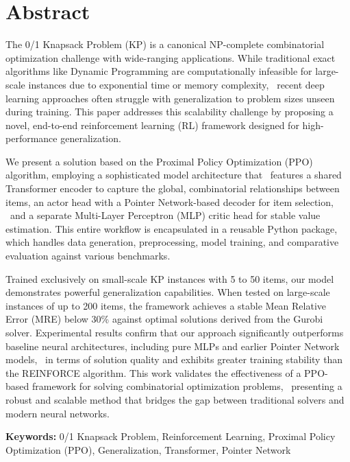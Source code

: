 
\chapter*{Abstract}

The 0/1 Knapsack Problem (KP) is a canonical NP-complete combinatorial optimization challenge with wide-ranging applications.
While traditional exact algorithms like Dynamic Programming are computationally infeasible for large-scale instances due to exponential time or memory complexity, \
 recent deep learning approaches often struggle with generalization to problem sizes unseen during training.
This paper addresses this scalability challenge by proposing a novel, end-to-end reinforcement learning (RL) framework designed for high-performance generalization.

We present a solution based on the Proximal Policy Optimization (PPO) algorithm, employing a sophisticated model architecture that \
features a shared Transformer encoder to capture the global, combinatorial relationships between items, an actor head with a Pointer Network-based decoder for item selection, \
 and a separate Multi-Layer Perceptron (MLP) critic head for stable value estimation.
This entire workflow is encapsulated in a reusable Python package, which handles data generation, preprocessing, model training, and comparative evaluation against various benchmarks.

Trained exclusively on small-scale KP instances with 5 to 50 items, our model demonstrates powerful generalization capabilities.
When tested on large-scale instances of up to 200 items, the framework achieves a stable Mean Relative Error (MRE) below 30\% against optimal solutions derived from the Gurobi solver.
Experimental results confirm that our approach significantly outperforms baseline neural architectures, including pure MLPs and earlier Pointer Network models, \
 in terms of solution quality and exhibits greater training stability than the REINFORCE algorithm.
This work validates the effectiveness of a PPO-based framework for solving combinatorial optimization problems, \
 presenting a robust and scalable method that bridges the gap between traditional solvers and modern neural networks.

\vspace{1em}
\noindent\small\textbf{Keywords:} 0/1 Knapsack Problem, Reinforcement Learning, Proximal Policy Optimization (PPO), Generalization, Transformer, Pointer Network
